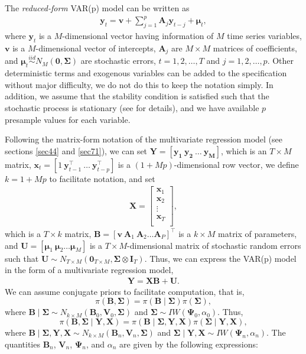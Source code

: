 The \textit{reduced-form} VAR(p) model can be written as
\begin{align}\label{eqVAR}
	\bm{y}_t=\bm{v} + \sum_{j=1}^p\bm{A}_{j}\bm{y}_{t-j}+\bm{\mu}_t,
\end{align}
where $\bm{y}_t$ is a $M$-dimensional vector having information of $M$ time series variables, $\bm{v}$ is a $M$-dimensional vector of intercepts, $\bm{A}_{j}$ are $M\times M$ matrices of coefficients, and $\bm{\mu}_t \stackrel{iid}{\sim} N_M(\bm{0}, \bm{\Sigma})$ are stochastic errors, $t=1,2,\dots,T$ and $j=1,2,\dots,p$. Other deterministic terms and exogenous variables can be added to the specification without major difficulty, we do not do this to keep the notation simply. In addition, we assume that the stability condition is satisfied such that the stochastic process is stationary (see \cite[Chap.~2]{helmut2005new} for details), and we have available $p$ presample values for each variable. 

Following the matrix-form notation of the multivariate regression model (see sections \ref{sec44} and \ref{sec71}), we can set $\bm{Y}=\left[{\bm{y_{1}}} \ {\bm{y_{2}}} \ \ldots \ {\bm{y_{M}}}\right]$, which is an $ T\times M$ matrix, $\bm{x}_t=[1 \ \bm{y}_{t-1}^{\top} \ \dots \ \bm{y}_{t-p}^{\top}]$ is a $(1+Mp)$-dimensional row vector, we define $k=1+Mp$ to facilitate notation, and set \begin{align*}
\bm{X}=\begin{bmatrix}
	\bm{x}_1\\
	\bm{x}_2\\
	\vdots \\
	\bm{x}_T\\
\end{bmatrix},
\end{align*}
which is a $ T\times k$ matrix, $\bm{B}=\left[\bm{v} \ \bm{A}_{1} \ \bm{A}_{2} \ldots \bm{A}_{P}\right]^{\top}$ is a $ k \times M$ matrix of parameters, and $\bm{U}=\left[\bm{\mu}_{1} \ \bm{\mu}_{2}\ldots \bm{\mu}_{M}\right]$ is a $T\times M$-dimensional matrix of stochastic random errors such that $\bm{U}\sim N_{T\times M}(\bm{0}_{T\times M},\bm{\Sigma}\otimes \bm{I}_T)$. Thus, we can express the VAR(p) model in the form of a multivariate regression model,
\begin{align*}
	\bm{Y}=\bm{X}\bm{B}+\bm{U}.
\end{align*}
We can assume conjugate priors to facilitate computation, that is, 
\[
\pi({\bm{B}}, {\bm{\Sigma}}) = \pi({\bm{B}} \mid {\bm{\Sigma}}) \pi({\bm{\Sigma}}),
\]
where ${\bm{B}} \mid {\bm{\Sigma}} \sim N_{k \times M}({\bm{B}}_{0}, {\bm{V}}_{0}, {\bm{\Sigma}})$ and ${\bm{\Sigma}} \sim IW({\bm{\Psi}}_{0}, \alpha_{0})$. Thus, 
\[
\pi({\bm{B}}, {\bm{\Sigma}} \mid {\bm{Y}}, {\bm{X}}) = \pi({\bm{B}} \mid {\bm{\Sigma}}, {\bm{Y}}, {\bm{X}}) \pi({\bm{\Sigma}} \mid {\bm{Y}}, {\bm{X}}),
\]
where ${\bm{B}} \mid {\bm{\Sigma}}, {\bm{Y}}, {\bm{X}} \sim N_{k \times M}({\bm{B}}_n, {\bm{V}}_n, {\bm{\Sigma}})$ and ${\bm{\Sigma}} \mid {\bm{Y}}, {\bm{X}} \sim IW({\bm{\Psi}}_n, \alpha_n)$. The quantities ${\bm{B}}_n$, ${\bm{V}}_n$, ${\bm{\Psi}}_n$, and $\alpha_n$ are given by the following expressions:

